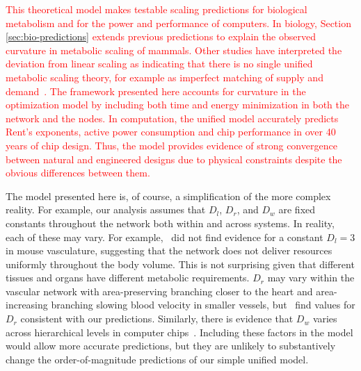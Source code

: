 \documentclass[12pt]{article}
\newcommand{\red}[1]{\textcolor{red}{#1}}
\begin{document}
\red{This theoretical model makes testable scaling predictions for biological metabolism and for the power and performance of computers.  In biology, Section
\ref{sec:bio-predictions} extends previous predictions to explain the
observed curvature in metabolic scaling of mammals.  \red{Other studies have interpreted the
deviation from linear scaling as indicating that there is no single unified metabolic scaling theory, for example as imperfect matching of supply and demand~\cite{banavar2002supply}. The
framework presented here accounts for curvature in the optimization model by including both time and energy minimization in both the network and the nodes.} In computation, the unified model accurately predicts Rent's exponents, active power consumption and chip performance in over 40 years of chip design.
Thus,
the model provides evidence of strong convergence between natural and
engineered designs due to physical constraints despite the obvious
differences between them.} 

The model presented here is, of course, a simplification of the more
complex reality. For example, our analysis assumes that $D_l$, $D_r$,
and $D_w$ are fixed constants throughout the network both within and
across systems. In reality, each of these may vary.  For
example,~\cite{newberry2015testing} did not find evidence for a
constant $D_l = 3$ in mouse vasculature, suggesting that the network
does not deliver resources uniformly throughout the body volume. This
is not surprising given that different tissues and organs have
different metabolic requirements. $D_r$ may vary
within the vascular network with area-preserving branching closer to the heart and area-increasing branching slowing blood velocity in smaller
vessels, but~\cite{newberry2015testing} find values for $D_r$
consistent with our predictions.  Similarly, there is evidence that
$D_w$ varies across hierarchical levels in computer
chips~\cite{ozaktas2004information}. Including these factors in the
model would allow more accurate predictions, but they are unlikely to
substantively change the order-of-magnitude predictions of 
our simple unified model.
\end{document}

